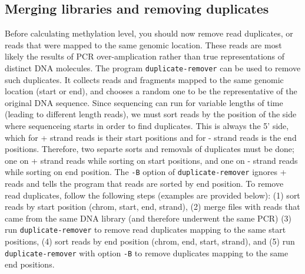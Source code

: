 \documentclass[10pt]{article}
\newcommand{\prog}[1]{\texttt{#1}}
\newcommand{\op}[1]{\texttt{#1}}
\begin{document}



\subsection{Merging libraries and removing duplicates}
\label{sec:mapping}

Before calculating methylation level, you should now remove read
duplicates, or reads that were mapped to the same genomic
location. These reads are most likely the results of PCR
over-amplication rather than true representations of distinct DNA
molecules. The program \prog{duplicate-remover} can be used to remove
such duplicates. It collects reads and fragments mapped to the same
genomic location (start or end), and chooses a random one to be the
representative of the original DNA sequence. Since sequencing can run
for variable lengths of time (leading to different length reads), we
must sort reads by the position of the side where sequenceing starts
in order to find duplicates. This is always the 5' side, which for +
strand reads is their start positions and for - strand reads is the
end positions. Therefore, two separte sorts and removals of duplicates
must be done; one on + strand reads while sorting on start positions,
and one on - strand reads while sorting on end position. The \op{-B}
option of \prog{duplicate-remover} ignores + reads and tells the
program that reads are sorted by end position. To remove read
duplicates, follow the following steps (examples are provided below):
(1) sort reads by start position (chrom, start, end, strand), (2)
merge files with reads that came from the same DNA library (and
therefore underwent the same PCR) (3) run \prog{duplicate-remover} to
remove read duplicates mapping to the same start positions, (4) sort
reads by end position (chrom, end, start, strand), and (5) run
\prog{duplicate-remover} with option \op{-B} to remove duplicates
mapping to the same end positions.
\end{document}
